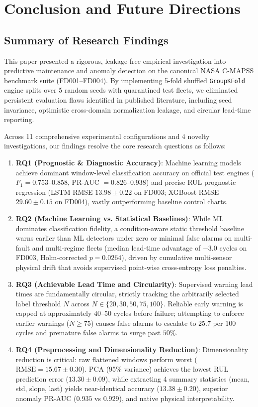 \section{Conclusion and Future Directions}
\label{sec:conclusion}

\subsection{Summary of Research Findings}
This paper presented a rigorous, leakage-free empirical investigation into predictive maintenance and anomaly detection on the canonical NASA C-MAPSS benchmark suite (FD001--FD004). By implementing 5-fold shuffled \texttt{GroupKFold} engine splits over 5 random seeds with quarantined test fleets, we eliminated persistent evaluation flaws identified in published literature, including seed invariance, optimistic cross-domain normalization leakage, and circular lead-time reporting.

Across 11 comprehensive experimental configurations and 4 novelty investigations, our findings resolve the core research questions as follows:
\begin{enumerate}
    \item \textbf{RQ1 (Prognostic \& Diagnostic Accuracy)}: Machine learning models achieve dominant window-level classification accuracy on official test engines ($F_1 = 0.753$--$0.858$, PR-AUC $= 0.826$--$0.938$) and precise RUL prognostic regression (LSTM RMSE $13.98 \pm 0.22$ on FD003; XGBoost RMSE $29.60 \pm 0.15$ on FD004), vastly outperforming baseline control charts.
    \item \textbf{RQ2 (Machine Learning vs. Statistical Baselines)}: While ML dominates classification fidelity, a condition-aware static threshold baseline warns earlier than ML detectors under zero or minimal false alarms on multi-fault and multi-regime fleets (median lead-time advantage of $-3.0$ cycles on FD003, Holm-corrected $p = 0.0264$), driven by cumulative multi-sensor physical drift that avoids supervised point-wise cross-entropy loss penalties.
    \item \textbf{RQ3 (Achievable Lead Time and Circularity)}: Supervised warning lead times are fundamentally circular, strictly tracking the arbitrarily selected label threshold $N$ across $N \in \{20, 30, 50, 75, 100\}$. Reliable early warning is capped at approximately $40$--$50$ cycles before failure; attempting to enforce earlier warnings ($N \ge 75$) causes false alarms to escalate to $25.7$ per 100 cycles and premature false alarms to surge past $50\%$.
    \item \textbf{RQ4 (Preprocessing and Dimensionality Reduction)}: Dimensionality reduction is critical: raw flattened windows perform worst ($\text{RMSE} = 15.67 \pm 0.30$). PCA (95\% variance) achieves the lowest RUL prediction error ($13.30 \pm 0.09$), while extracting 4 summary statistics (mean, std, slope, last) yields near-identical accuracy ($13.38 \pm 0.20$), superior anomaly PR-AUC ($0.935$ vs $0.929$), and native physical interpretability.
\end{enumerate}


